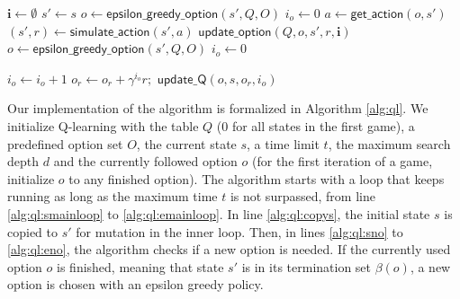 \begin{algorithm}[h]
	\caption{$\mathsf{SMDP~Q-learning}(Q, O, s, t, d, o)$}
	\label{alg:ql}
	\begin{algorithmic}[1]
		\State $\mathbf{i} \gets \emptyset$ 
		 \label{alg:ql:smainloop}
			\State $s' \gets s$ \label{alg:ql:copys} 
			 \label{alg:ql:sno} 
				\State $o \gets \mathsf{epsilon\_greedy\_option}(s', Q, O)$ 
				\State $i_o \gets 0$ 
			\EndIf \label{alg:ql:eno}
			 \label{alg:ql:sfor}
				\State $a \gets \mathsf{get\_action}(o, s')$ 
				\State $(s', r) \gets \mathsf{simulate\_action}(s', a)$ \label{alg:ql:apply}
				\State $\mathsf{update\_option}(Q, o, s', r, \mathbf{i})$ 
					\State $o \gets \mathsf{epsilon\_greedy\_option}(s', Q, O)$ \label{alg:ql:epsgreedy}
					\State $i_o \gets 0$
				\EndIf
			\EndFor \label{alg:ql:efor}
		\EndWhile \label{alg:ql:emainloop}
		\State {}
	\end{algorithmic}
\end{algorithm}
\begin{algorithm}[h]
	\caption{$\mathsf{update\_option}(Q, o, s, r, \mathbf{i})$}
	\label{alg:update}
	\begin{algorithmic}[1]
		\State $i_o \gets i_o + 1$ 
		\State $o_r \gets o_r + \gamma^{i_o} r;$
		 
			\State $\mathsf{update\_Q}(o, s, o_r, i_o)$ 
		\EndIf
	\end{algorithmic}
\end{algorithm}

Our implementation of the algorithm is formalized in Algorithm \ref{alg:ql}. We
initialize Q-learning with the table $Q$ (0 for all states in the first game), a
predefined option set $O$, the current state $s$, a time limit $t$, the maximum
search depth $d$ and the currently followed option $o$ (for the first iteration
of a game, initialize $o$ to any finished option). The algorithm starts with a
loop that keeps running as long as the maximum time $t$ is not surpassed, from
line \ref{alg:ql:smainloop} to \ref{alg:ql:emainloop}. In line
\ref{alg:ql:copys}, the initial state $s$ is copied to $s'$ for mutation in the
inner loop. Then, in lines \ref{alg:ql:sno} to \ref{alg:ql:eno}, the algorithm
checks if a new option is needed. If the currently used option $o$ is finished,
meaning that state $s'$ is in its termination set $\beta(o)$, a new option is
chosen with an epsilon greedy policy. 

